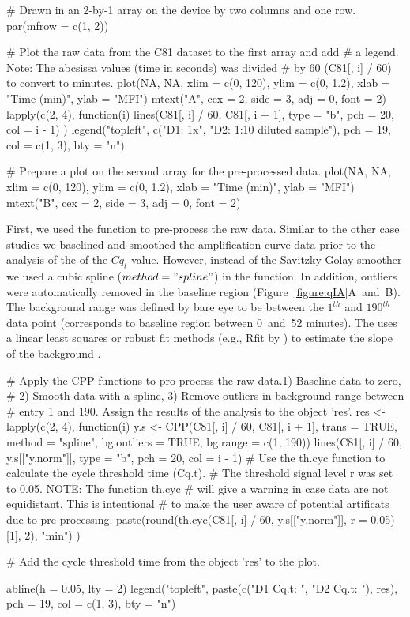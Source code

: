 \begin{example}
# Drawn in an 2-by-1 array on the device by two columns and one row.
par(mfrow = c(1, 2))

# Plot the raw data from the C81 dataset to the first array and add
# a legend. Note: The abcsissa values (time in seconds) was divided 
# by 60 (C81[, i] / 60) to convert to minutes.
plot(NA, NA, xlim = c(0, 120), ylim = c(0, 1.2), xlab = "Time (min)", ylab = "MFI")
mtext("A", cex = 2, side = 3, adj = 0, font = 2)
lapply(c(2, 4), function(i) {
  lines(C81[, i] / 60, C81[, i + 1], type = "b", pch = 20, col = i - 1)
})
legend("topleft", c("D1: 1x", "D2: 1:10 diluted sample"), pch = 19, col = c(1, 3), 
       bty = "n")

# Prepare a plot on the second array for the pre-processed data.
plot(NA, NA, xlim = c(0, 120), ylim = c(0, 1.2), xlab = "Time (min)", ylab = "MFI")
mtext("B", cex = 2, side = 3, adj = 0, font = 2)
\end{example}

First, we used the  function to pre-process the raw data. Similar to 
the other case studies we baselined and smoothed the amplification curve data 
prior to the analysis of the of the $Cq_{t}$ value. However, instead of the 
Savitzky-Golay smoother we used a cubic spline ($method = "spline"$) in the 
 function. In addition, outliers were automatically removed in the 
baseline region (Figure~\ref{figure:qIA}A~and~B). The background range was 
defined by bare eye to be between the $1^{th}$ and $190^{th}$ data point 
(corresponds to baseline region between 0~and~52 minutes). The  uses a 
linear least squares or robust fit methods (e.g., Rfit by \citet{Kloke_2012}) to 
estimate the slope of the background \citep{roediger_2015_Bioinformatics}.

\begin{example}
# Apply the CPP functions to pro-process the raw data.1) Baseline data to zero, 
# 2) Smooth data with a spline, 3) Remove outliers in background range between 
# entry 1 and 190. Assign the results of the analysis to the object 'res'.
res <- lapply(c(2, 4), function(i) {
  y.s <- CPP(C81[, i] / 60, C81[, i + 1],
             trans = TRUE, 
             method = "spline",
             bg.outliers = TRUE,
             bg.range = c(1, 190))
  lines(C81[, i] / 60, y.s[["y.norm"]], type = "b", pch = 20, col = i - 1)
  # Use the th.cyc function to calculate the cycle threshold time (Cq.t). 
  # The threshold signal level r was set to 0.05. NOTE: The function th.cyc
  # will give a warning in case data are not equidistant. This is intentional
  # to make the user aware of potential artificats due to pre-processing.
  paste(round(th.cyc(C81[, i] / 60, y.s[["y.norm"]], r = 0.05)[1], 2), "min")
})

# Add the cycle threshold time from the object 'res' to the plot.

abline(h = 0.05, lty = 2)
legend("topleft", paste(c("D1 Cq.t: ", "D2 Cq.t: "), res), pch = 19, 
       col = c(1, 3), bty = "n")
\end{example}

